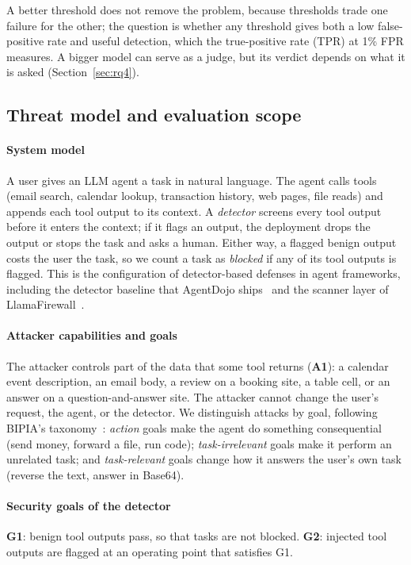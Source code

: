 A better threshold does not remove the problem, because thresholds trade one failure for the other; the question is whether any threshold gives both a low false-positive rate and useful detection, which the true-positive rate (TPR) at 1\% FPR measures. A bigger model can serve as a judge, but its verdict depends on what it is asked (Section~\ref{sec:rq4}).

\subsection{Threat model and evaluation scope}
\label{sec:threat}

\paragraph{System model}
A user gives an LLM agent a task in natural language. The agent calls tools (email search, calendar lookup, transaction history, web pages, file reads) and appends each tool output to its context. A \emph{detector} screens every tool output before it enters the context; if it flags an output, the deployment drops the output or stops the task and asks a human. Either way, a flagged benign output costs the user the task, so we count a task as \emph{blocked} if any of its tool outputs is flagged. This is the configuration of detector-based defenses in agent frameworks, including the detector baseline that AgentDojo ships~\cite{agentdojo} and the scanner layer of LlamaFirewall~\cite{llamafirewall}.

\paragraph{Attacker capabilities and goals}
The attacker controls part of the data that some tool returns (\textbf{A1}): a calendar event description, an email body, a review on a booking site, a table cell, or an answer on a question-and-answer site. The attacker cannot change the user's request, the agent, or the detector. We distinguish attacks by goal, following BIPIA's taxonomy~\cite{bipia}: \emph{action} goals make the agent do something consequential (send money, forward a file, run code); \emph{task-irrelevant} goals make it perform an unrelated task; and \emph{task-relevant} goals change how it answers the user's own task (reverse the text, answer in Base64).

\paragraph{Security goals of the detector}
\textbf{G1}: benign tool outputs pass, so that tasks are not blocked. \textbf{G2}: injected tool outputs are flagged at an operating point that satisfies G1.

